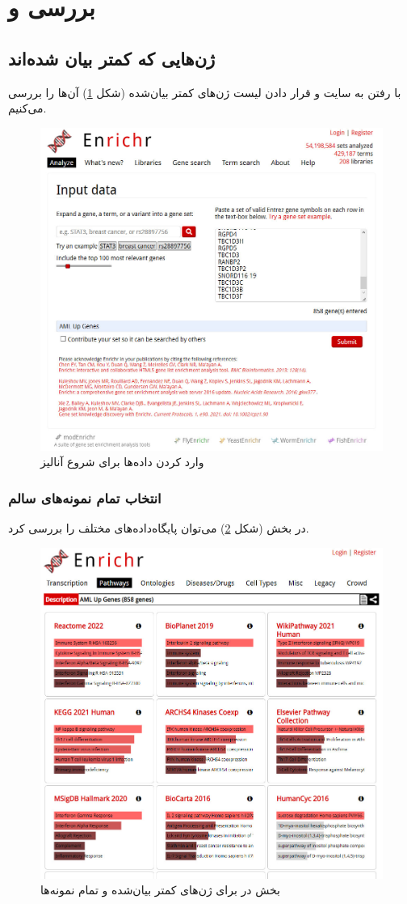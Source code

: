 \documentclass{article}
\begin{document}
\section{بررسی  و }
\subsection{ژن‌هایی که کمتر بیان شده‌اند}
با رفتن به سایت \href{https://maayanlab.cloud/Enrichr/}{} و قرار دادن لیست ژن‌های کمتر بیان‌شده (شکل \ref{fig:enrichr}) آن‌‌ها را بررسی می‌کنیم.
\begin{figure}[h!]
	\centering
	\includegraphics[width=0.5\columnwidth]{figs/enrichr.jpg}
	\caption{وارد کردن داده‌ها برای شروع آنالیز}
	\label{fig:enrichr}
\end{figure}

\subsubsection{انتخاب تمام نمونه‌های سالم}
در بخش  (شکل \ref{fig:enrichr-pathways}) می‌توان پایگاه‌داده‌های  مختلف را بررسی کرد.
\begin{figure}[h!]
	\centering
	\includegraphics[width=0.5\columnwidth]{figs/enrichr-pathways.jpg}
	\caption{بخش  در  برای ژن‌های کمتر بیان‌شده و تمام نمونه‌ها}
	\label{fig:enrichr-pathways}
\end{figure}
\end{document}
